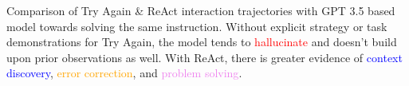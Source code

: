 \begin{table}
\vspace{0.5em}
\caption{Comparison of Try Again \& ReAct interaction trajectories with GPT 3.5 based model towards solving the same instruction. Without explicit strategy or task demonstrations for Try Again, the model tends to \textcolor{red}{hallucinate} and doesn't build upon prior observations as well. With ReAct, there is greater evidence of \textcolor{blue}{context discovery}, \textcolor{orange}{error correction}, and \textcolor{violet}{problem solving}.}
\label{table:expr-traj-analysis}
\vspace{-2em}
\end{table}